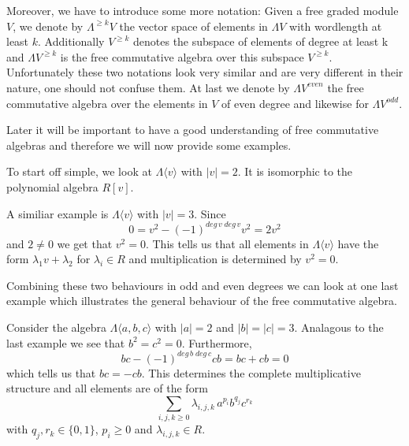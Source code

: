  

\centerline{
}



Moreover, we have to introduce some more notation: Given a free graded module $V$, we denote 
by $\Lambda^{\geq k} V$ the vector space of elements in $\Lambda V$ with wordlength at least $k$.
Additionally $V^{\geq k}$ denotes the subspace of elements of degree at least k and ${\Lambda V}^{\geq k}$ 
is the free commutative algebra over this subspace $V^{\geq k}$. Unfortunately these two notations look 
very similar and are very different in their nature, one should not confuse them.
At last we denote by $\Lambda V^{even}$ the free commutative algebra over the elements in $V$ of even degree
and likewise for $\Lambda V^{odd}$.
\par

Later it will be important to have a good understanding of free commutative algebras and therefore
we will now provide some examples.

\begin{Example}
\label{ex:FreeCommutativeEvenDegrees}
 To start off simple, we look at $\Lambda \langle v \rangle$ with $|v| = 2$. 
 It is isomorphic to the polynomial algebra $R[v]$.
\end{Example}

\begin{Example}
\label{ex:FreeCommutativeOddDegrees}
 A similiar example is $\Lambda \langle v \rangle$ with $|v| = 3$. Since 
 $$0 = v^2 - (-1)^{deg \, v \; deg \, v} v^2 = 2 v^2$$
 and $2 \neq 0$ we get that $v^2 = 0$. This tells us that all elements in $\Lambda \langle v \rangle$
 have the form $\lambda_1 v + \lambda_2$ for $\lambda_i \in R$ and multiplication is determined by $v^2 = 0$.
\end{Example}

Combining these two behaviours in odd and even degrees we can look at one last example which
illustrates the general behaviour of the free commutative algebra.

\begin{Example}
 Consider the algebra $\Lambda \langle a,b,c \rangle$ with $|a| = 2$ and $|b| = |c| = 3$.
 Analagous to the last example we see that $b^2 = c^2 = 0$. Furthermore,
 $$ bc - (-1)^{deg \, b \; deg \, c} cb = bc + cb = 0$$
 which tells us that $bc = - cb$. This determines the complete multiplicative structure 
 and all elements are of the form 
 $$ \sum_{i,j,k \geq 0} \lambda_{i,j,k} \, a^{p_i} b^{q_j} c^{r_k}$$
 with  $q_j, r_k \in \lbrace 0,1 \rbrace$, $p_i \geq 0$ and $\lambda_{i,j,k} \in R$.
\end{Example}


